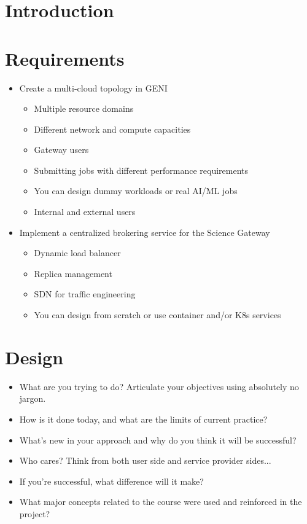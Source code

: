 \documentclass{ReportCUNY}
\begin{document}
\setlength{\belowdisplayskip}{0pt} \setlength{\belowdisplayshortskip}{1pt}
\setlength{\abovedisplayskip}{0pt} \setlength{\abovedisplayshortskip}{1pt}
\setlength{\abovedisplayskip}{5pt}
\setlength{\belowdisplayskip}{5pt}

\section{Introduction}

\section{Requirements}

\begin{itemize}
	\item Create a multi-cloud topology in GENI
	\begin{itemize}
		\item Multiple resource domains
		\item Different network and compute capacities
		\item Gateway users
		\item Submitting jobs with different performance requirements
		\item You can design dummy workloads or real AI/ML jobs
		\item Internal and external users
	\end{itemize}
	
	\item Implement a centralized brokering service for the Science Gateway
	\begin{itemize}
		\item Dynamic load balancer
		\item Replica management
		\item SDN for traffic engineering
		\item You can design from scratch or use container and/or K8s services
	\end{itemize}
	
\end{itemize}

\section{Design}

\begin{itemize}
	\item What are you trying to do? Articulate your objectives using absolutely no jargon.
	\item How is it done today, and what are the limits of current practice?
	\item What's new in your approach and why do you think it will be successful?
	\item Who cares? Think from both user side and service provider sides...
	\item If you're successful, what difference will it make?
	\item What major concepts related to the course were used and reinforced in the project?
\end{itemize}
\end{document}

